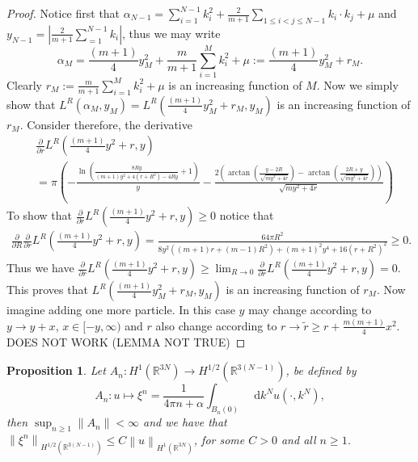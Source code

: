 \documentclass[a4paper,11pt]{article}
\newcommand{\norm}[1]{\left\lVert #1 \right\rVert}
\newcommand{\abs}[1]{\left\lvert #1 \right\rvert}
\newcommand*\diff{\mathop{}\!\mathrm{d}}
\newcommand{\R}{\mathbb{R}}
\newtheorem{proposition}{Proposition}
\numberwithin{equation}{section}
\begin{document}
	\begin{proof}
		Notice first that $ \alpha_{N-1}=\sum_{i=1}^{N-1}k_i^2+\frac{2}{m+1}\sum_{1\leq i<j\leq N-1} k_i\cdot k_j+\mu$ and $ y_{N-1}=\abs{\frac{2}{m+1}\sum_{=1}^{N-1}k_i} $, thus we may write\begin{equation}
		\alpha_M=\frac{(m+1)}{4}y_M^2+\frac{m}{m+1}\sum_{i=1}^{M}k_i^2+\mu:=\frac{(m+1)}{4}y_M^2+r_M.
		\end{equation}
		Clearly $ r_M:=\frac{m}{m+1}\sum_{i=1}^{M}k_i^2+\mu $ is an increasing function of $ M $. Now we simply show that $ L^R(\alpha_M,y_M)=L^R\left(\frac{(m+1)}{4}y_M^2+r_M,y_M\right) $ is an increasing function of $ r_M $. Consider therefore, the derivative \begin{equation}
		\begin{aligned}
		&\frac{\partial}{\partial r}L^R\left(\frac{(m+1)}{4}y^2+r,y\right)\\&=\pi  \left(-\frac{\ln \left(\frac{8 R y}{(m+1) y^2+4 \left(r+R^2\right)-4 R y}+1\right)}{y}-\frac{2 \left(\arctan\left(\frac{y-2 R}{\sqrt{m y^2+4 r}}\right)-\arctan\left(\frac{2 R+y}{\sqrt{m y^2+4
					r}}\right)\right)}{\sqrt{m y^2+4 r}}\right)
		\end{aligned}
		\end{equation}
		To show that $ \frac{\partial}{\partial r}L^R\left(\frac{(m+1)}{4}y^2+r,y\right)\geq0 $ notice that \begin{equation}
		\begin{aligned}
		\frac{\partial}{\partial R}\frac{\partial}{\partial r}L^R\left(\frac{(m+1)}{4}y^2+r,y\right)=\frac{64 \pi  R^2}{8 y^2 \left((m+1) r+(m-1) R^2\right)+(m+1)^2 y^4+16 \left(r+R^2\right)^2}\geq0.
		\end{aligned}
		\end{equation}
		Thus we have $ \frac{\partial}{\partial r}L^R\left(\frac{(m+1)}{4}y^2+r,y\right)\geq\lim_{R\to0}\frac{\partial}{\partial r}L^R\left(\frac{(m+1)}{4}y^2+r,y\right)=0 $. This proves that $ L^R\left(\frac{(m+1)}{4}y_M^2+r_M,y_M\right) $ is an increasing function of $ r_M $. Now imagine adding one more particle. In this case $ y $ may change according to $ y\to y+x $, $ x\in[-y,\infty) $ and $ r $ also change according to $ r\to\tilde{r}\geq r+\frac{m(m+1)}{4}x^2 $.
		DOES NOT WORK (LEMMA NOT TRUE) 
	\end{proof}
	\begin{proposition}
		Let $ A_n: H^1(\R^{3N})\to H^{1/2}(\R^{3(N-1)}) $, be defined by \begin{equation}
		A_n: u\mapsto \xi^n=\frac{1}{4\pi n +\alpha}\int_{B_n(0)}\diff k^N u(\cdot,k^N),
		\end{equation}
		then $ \sup_{n\geq1}\norm{A_n}<\infty $ and we have that $ \norm{\xi^n}_{H^{1/2}(\R^{3(N-1)})}\leq C\norm{u}_{H^{1}(\R^{3N})} $, for some $ C>0 $ and all $ n\geq1 $. 	
		\end{proposition}
\end{document}
